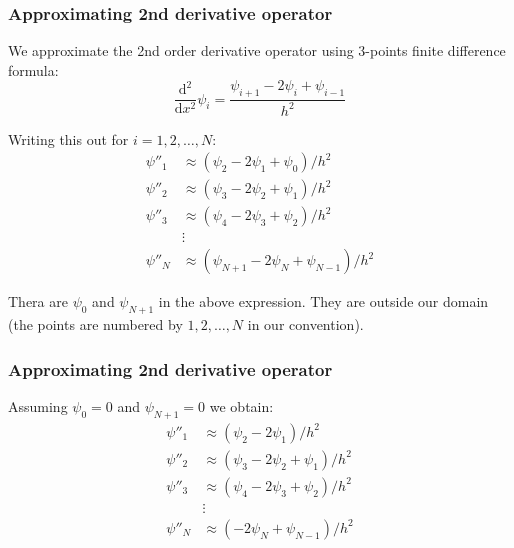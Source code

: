 \begin{frame}
\frametitle{Approximating 2nd derivative operator}

We approximate the 2nd order derivative operator using 3-points finite difference
formula:
\begin{equation*}
\frac{\mathrm{d}^2}{\mathrm{d}x^2} \psi_{i} =
\frac{\psi_{i+1} - 2\psi_{i} + \psi_{i-1}}{h^2}
\end{equation*}

Writing this out for $i = 1,2,\ldots,N$:
\begin{align*}
\psi''_{1} & \approx \left( \psi_{2} - 2\psi_{1} + \psi_{0} \right)/h^2 \\
\psi''_{2} & \approx \left( \psi_{3} - 2\psi_{2} + \psi_{1} \right)/h^2 \\
\psi''_{3} & \approx \left( \psi_{4} - 2\psi_{3} + \psi_{2} \right)/h^2 \\
& \vdots \\
\psi''_{N} & \approx \left( \psi_{N+1} - 2\psi_{N} + \psi_{N-1} \right)/h^2
\end{align*}

Thera are $\psi_{0}$ and $\psi_{N+1}$ in the above expression. They are outside
our domain (the points are numbered by $1,2,\ldots,N$ in our convention).

\end{frame}


\begin{frame}
\frametitle{Approximating 2nd derivative operator}

Assuming $\psi_{0} = 0$ and $\psi_{N+1} = 0$ we obtain:
\begin{align*}
\psi''_{1} & \approx \left( \psi_{2} - 2\psi_{1} \right)/h^2 \\
\psi''_{2} & \approx \left( \psi_{3} - 2\psi_{2} + \psi_{1} \right)/h^2 \\
\psi''_{3} & \approx \left( \psi_{4} - 2\psi_{3} + \psi_{2} \right)/h^2 \\
& \vdots \\
\psi''_{N} & \approx \left( - 2\psi_{N} + \psi_{N-1} \right)/h^2 \\
\end{align*}

\end{frame}


